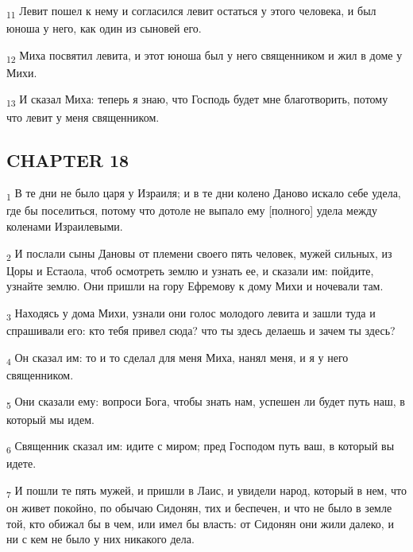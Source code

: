 \begin{tcolorbox}
\textsubscript{11} Левит пошел к нему и согласился левит остаться у этого человека, и был юноша у него, как один из сыновей его.
\end{tcolorbox}
\begin{tcolorbox}
\textsubscript{12} Миха посвятил левита, и этот юноша был у него священником и жил в доме у Михи.
\end{tcolorbox}
\begin{tcolorbox}
\textsubscript{13} И сказал Миха: теперь я знаю, что Господь будет мне благотворить, потому что левит у меня священником.
\end{tcolorbox}
\subsection{CHAPTER 18}
\begin{tcolorbox}
\textsubscript{1} В те дни не было царя у Израиля; и в те дни колено Даново искало себе удела, где бы поселиться, потому что дотоле не выпало ему [полного] удела между коленами Израилевыми.
\end{tcolorbox}
\begin{tcolorbox}
\textsubscript{2} И послали сыны Дановы от племени своего пять человек, мужей сильных, из Цоры и Естаола, чтоб осмотреть землю и узнать ее, и сказали им: пойдите, узнайте землю. Они пришли на гору Ефремову к дому Михи и ночевали там.
\end{tcolorbox}
\begin{tcolorbox}
\textsubscript{3} Находясь у дома Михи, узнали они голос молодого левита и зашли туда и спрашивали его: кто тебя привел сюда? что ты здесь делаешь и зачем ты здесь?
\end{tcolorbox}
\begin{tcolorbox}
\textsubscript{4} Он сказал им: то и то сделал для меня Миха, нанял меня, и я у него священником.
\end{tcolorbox}
\begin{tcolorbox}
\textsubscript{5} Они сказали ему: вопроси Бога, чтобы знать нам, успешен ли будет путь наш, в который мы идем.
\end{tcolorbox}
\begin{tcolorbox}
\textsubscript{6} Священник сказал им: идите с миром; пред Господом путь ваш, в который вы идете.
\end{tcolorbox}
\begin{tcolorbox}
\textsubscript{7} И пошли те пять мужей, и пришли в Лаис, и увидели народ, который в нем, что он живет покойно, по обычаю Сидонян, тих и беспечен, и что не было в земле той, кто обижал бы в чем, или имел бы власть: от Сидонян они жили далеко, и ни с кем не было у них никакого дела.
\end{tcolorbox}
